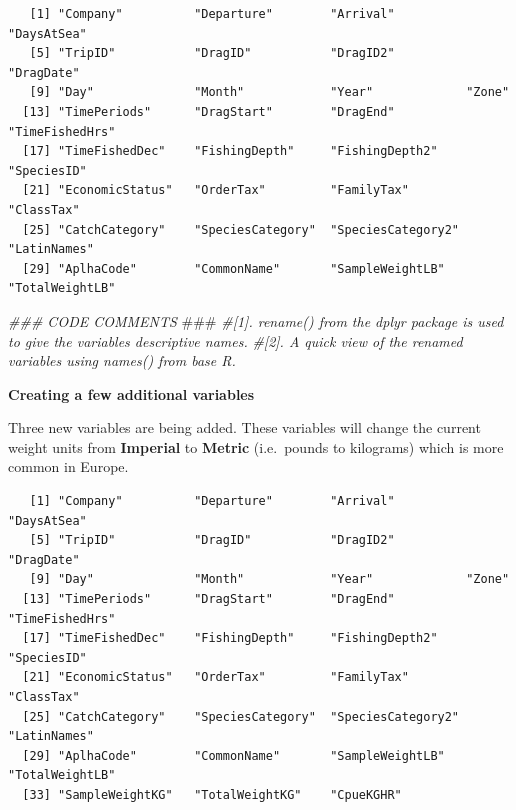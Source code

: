\documentclass[
]{book}
\newenvironment{Shaded}{\begin{snugshade}}{\end{snugshade}}
\newcommand{\AlertTok}[1]{\textcolor[rgb]{0.94,0.16,0.16}{#1}}
\newcommand{\CommentTok}[1]{\textcolor[rgb]{0.56,0.35,0.01}{\textit{#1}}}
\newcommand{\DataTypeTok}[1]{\textcolor[rgb]{0.13,0.29,0.53}{#1}}
\newcommand{\FloatTok}[1]{\textcolor[rgb]{0.00,0.00,0.81}{#1}}
\newcommand{\KeywordTok}[1]{\textcolor[rgb]{0.13,0.29,0.53}{\textbf{#1}}}
\newcommand{\NormalTok}[1]{#1}
\newcommand{\OperatorTok}[1]{\textcolor[rgb]{0.81,0.36,0.00}{\textbf{#1}}}
\newcommand{\StringTok}[1]{\textcolor[rgb]{0.31,0.60,0.02}{#1}}
\begin{document}
\begin{verbatim}
   [1] "Company"          "Departure"        "Arrival"          "DaysAtSea"       
   [5] "TripID"           "DragID"           "DragID2"          "DragDate"        
   [9] "Day"              "Month"            "Year"             "Zone"            
  [13] "TimePeriods"      "DragStart"        "DragEnd"          "TimeFishedHrs"   
  [17] "TimeFishedDec"    "FishingDepth"     "FishingDepth2"    "SpeciesID"       
  [21] "EconomicStatus"   "OrderTax"         "FamilyTax"        "ClassTax"        
  [25] "CatchCategory"    "SpeciesCategory"  "SpeciesCategory2" "LatinNames"      
  [29] "AplhaCode"        "CommonName"       "SampleWeightLB"   "TotalWeightLB"
\end{verbatim}

\begin{Shaded}
\begin{Highlighting}[]
\CommentTok{### CODE COMMENTS }\AlertTok{###}
\CommentTok{#[1]. rename() from the dplyr package is used to give the variables descriptive names. }
\CommentTok{#[2]. A quick view of the renamed variables using names() from base R.}
\end{Highlighting}
\end{Shaded}

\textbf{Creating a few additional variables}

Three new variables are being added. These variables will change the current weight units from \textbf{Imperial} to \textbf{Metric} (i.e.~pounds to kilograms) which is more common in Europe.

\begin{Shaded}
\end{Shaded}

\begin{verbatim}
   [1] "Company"          "Departure"        "Arrival"          "DaysAtSea"       
   [5] "TripID"           "DragID"           "DragID2"          "DragDate"        
   [9] "Day"              "Month"            "Year"             "Zone"            
  [13] "TimePeriods"      "DragStart"        "DragEnd"          "TimeFishedHrs"   
  [17] "TimeFishedDec"    "FishingDepth"     "FishingDepth2"    "SpeciesID"       
  [21] "EconomicStatus"   "OrderTax"         "FamilyTax"        "ClassTax"        
  [25] "CatchCategory"    "SpeciesCategory"  "SpeciesCategory2" "LatinNames"      
  [29] "AplhaCode"        "CommonName"       "SampleWeightLB"   "TotalWeightLB"   
  [33] "SampleWeightKG"   "TotalWeightKG"    "CpueKGHR"
\end{verbatim}
\end{document}
